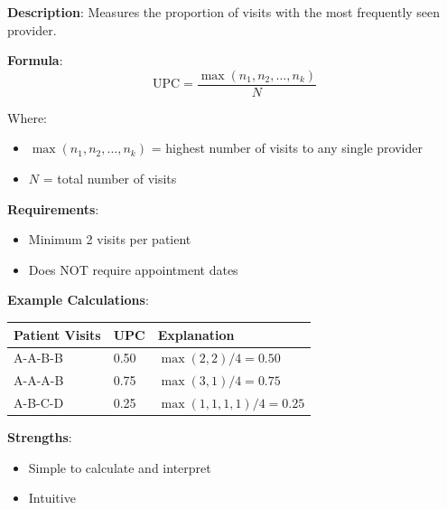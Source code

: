 \documentclass[11pt,a4paper]{article}
\newcommand{\upc}{\text{UPC}}
\begin{document}
\textbf{Description}: Measures the proportion of visits with the most frequently seen provider.

\textbf{Formula}:
\begin{equation}
\upc = \frac{\max(n_1, n_2, ..., n_k)}{N}
\end{equation}

Where:
\begin{itemize}
\item $\max(n_1, n_2, ..., n_k)$ = highest number of visits to any single provider
\item $N$ = total number of visits
\end{itemize}

\textbf{Requirements}:
\begin{itemize}
\item Minimum 2 visits per patient
\item Does NOT require appointment dates
\end{itemize}

\textbf{Example Calculations}:
\begin{table}[h]
\centering
\begin{tabular}{lll}
\toprule
Patient Visits & UPC & Explanation \\
\midrule
A-A-B-B & 0.50 & $\max(2,2)/4 = 0.50$ \\
A-A-A-B & 0.75 & $\max(3,1)/4 = 0.75$ \\
A-B-C-D & 0.25 & $\max(1,1,1,1)/4 = 0.25$ \\
\bottomrule
\end{tabular}
\end{table}

\textbf{Strengths}:
\begin{itemize}
\item Simple to calculate and interpret
\item Intuitive 
\end{itemize}
\end{document}
